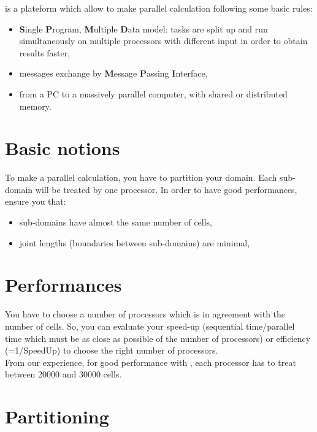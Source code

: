 \trust is a plateform which allow to make parallel calculation following some basic rules:
\begin{itemize}
\item \textbf{S}ingle \textbf{P}rogram, \textbf{M}ultiple \textbf{D}ata model: tasks are split up and run simultaneously on multiple processors with different input in order to obtain results faster,
\item messages exchange by \textbf{M}essage \textbf{P}assing \textbf{I}nterface,
\item from a PC to a massively parallel computer, with shared or distributed memory.
\end{itemize}


\section{Basic notions}
To make a parallel calculation, you have to partition your domain.
Each sub-domain will be treated by one processor.
In order to have good performances, ensure you that:
\begin{itemize}
\item sub-domains have almost the same number of cells,
\item joint lengths (boundaries between sub-domains) are minimal,
\end{itemize}



\section{Performances}
You have to choose a number of processors which is in agreement with the number of cells.
So, you can evaluate your speed-up (sequential time/parallel time which must be as close as possible of the number of processors) or efficiency (=1/SpeedUp) to choose the right number of processors.\\

From our experience, for good performance with \trust, each processor has to treat between 20000 and 30000 cells.



\section{Partitioning}

